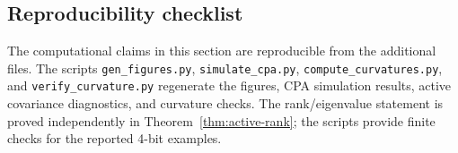 \subsection{Reproducibility checklist}\label{subsec:repro-checklist}

The computational claims in this section are reproducible from the additional
files.  The scripts \texttt{gen\_figures.py}, \texttt{simulate\_cpa.py},
\texttt{compute\_curvatures.py}, and \texttt{verify\_curvature.py} regenerate
the figures, CPA simulation results, active covariance diagnostics, and
curvature checks.  The
rank/eigenvalue statement is proved independently in
Theorem~\ref{thm:active-rank}; the scripts provide finite checks for the
reported 4-bit examples.
